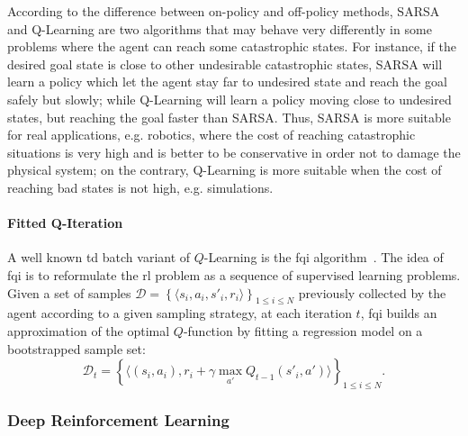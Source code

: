 According to the difference between on-policy and off-policy methods, SARSA and Q-Learning are two algorithms that may behave very differently in some problems where the agent can reach some catastrophic states. For instance, if the desired goal state is close to other undesirable catastrophic states, SARSA will learn a policy which let the agent stay far to undesired state and reach the goal safely but slowly; while Q-Learning will learn a policy moving close to undesired states, but reaching the goal faster than SARSA. Thus, SARSA is more suitable for real applications, e.g. robotics, where the cost of reaching catastrophic situations is very high and is better to be conservative in order not to damage the physical system; on the contrary, Q-Learning is more suitable when the cost of reaching bad states is not high, e.g. simulations.

\paragraph{Fitted Q-Iteration}\label{S:FQI}
A well known \gls{td} batch variant of $Q$-Learning is the \gls{fqi} algorithm~\cite{ernst2005tree}. The idea of \gls{fqi} is to reformulate the \gls{rl} problem as a sequence of supervised learning problems. Given a set of samples $\mathcal{D} = \left\{\langle s_i, a_i, s'_i, r_i \rangle \right\}_{1\leq i\leq N}$ previously collected by the agent according to a given sampling strategy, at each iteration $t$, \gls{fqi} builds an approximation of the optimal $Q$-function by fitting a regression model on a bootstrapped sample set:
\begin{equation}
 \mathcal{D}_t = \left\{ \langle (s_i,a_i), r_i + \gamma \max_{a'} Q_{t-1}\left(s'_i, a'\right) \rangle\right\}_{1 \leq i \leq N}.
\end{equation}

\subsubsection{Deep Reinforcement Learning}
